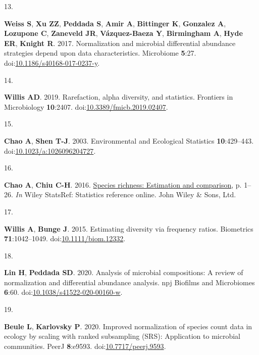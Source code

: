 \documentclass[
]{article}
\newlength{\cslhangindent}
\newlength{\csllabelwidth}
\newlength{\cslentryspacingunit} %
\newenvironment{CSLReferences}[2] %
 {%
  \setlength{\parindent}{0pt}
  \ifodd #1
  \let\oldpar\par
  \def\par{\hangindent=\cslhangindent\oldpar}
  \fi
  \setlength{\parskip}{#2\cslentryspacingunit}
 }%
 {}
\newcommand{\CSLLeftMargin}[1]{\parbox[t]{\csllabelwidth}{#1}}
\newcommand{\CSLRightInline}[1]{\parbox[t]{\linewidth - \csllabelwidth}{#1}\break}
\begin{document}
\begin{CSLReferences}{0}{1}
\leavevmode{}%
\CSLLeftMargin{13. }%
\CSLRightInline{\textbf{Weiss S}, \textbf{Xu ZZ}, \textbf{Peddada S},
\textbf{Amir A}, \textbf{Bittinger K}, \textbf{Gonzalez A},
\textbf{Lozupone C}, \textbf{Zaneveld JR}, \textbf{Vázquez-Baeza Y},
\textbf{Birmingham A}, \textbf{Hyde ER}, \textbf{Knight R}. 2017.
Normalization and microbial differential abundance strategies depend
upon data characteristics. Microbiome \textbf{5}:27.
doi:\href{https://doi.org/10.1186/s40168-017-0237-y}{10.1186/s40168-017-0237-y}.}

\leavevmode{}%
\CSLLeftMargin{14. }%
\CSLRightInline{\textbf{Willis AD}. 2019. Rarefaction, alpha diversity,
and statistics. Frontiers in Microbiology \textbf{10}:2407.
doi:\href{https://doi.org/10.3389/fmicb.2019.02407}{10.3389/fmicb.2019.02407}.}

\leavevmode{}%
\CSLLeftMargin{15. }%
\CSLRightInline{\textbf{Chao A}, \textbf{Shen T-J}. 2003. Environmental
and Ecological Statistics \textbf{10}:429--443.
doi:\href{https://doi.org/10.1023/a:1026096204727}{10.1023/a:1026096204727}.}

\leavevmode{}%
\CSLLeftMargin{16. }%
\CSLRightInline{\textbf{Chao A}, \textbf{Chiu C-H}. 2016.
\href{https://doi.org/10.1002/9781118445112.stat03432.pub2}{Species
richness: Estimation and comparison}, p. 1--26. \emph{In} Wiley
StatsRef: Statistics reference online. John Wiley \& Sons, Ltd.}

\leavevmode{}%
\CSLLeftMargin{17. }%
\CSLRightInline{\textbf{Willis A}, \textbf{Bunge J}. 2015. Estimating
diversity via frequency ratios. Biometrics \textbf{71}:1042--1049.
doi:\href{https://doi.org/10.1111/biom.12332}{10.1111/biom.12332}.}

\leavevmode{}%
\CSLLeftMargin{18. }%
\CSLRightInline{\textbf{Lin H}, \textbf{Peddada SD}. 2020. Analysis of
microbial compositions: A review of normalization and differential
abundance analysis. npj Biofilms and Microbiomes \textbf{6}:60.
doi:\href{https://doi.org/10.1038/s41522-020-00160-w}{10.1038/s41522-020-00160-w}.}

\leavevmode{}%
\CSLLeftMargin{19. }%
\CSLRightInline{\textbf{Beule L}, \textbf{Karlovsky P}. 2020. Improved
normalization of species count data in ecology by scaling with ranked
subsampling (SRS): Application to microbial communities. PeerJ
\textbf{8}:e9593.
doi:\href{https://doi.org/10.7717/peerj.9593}{10.7717/peerj.9593}.}


\end{CSLReferences}
\end{document}
